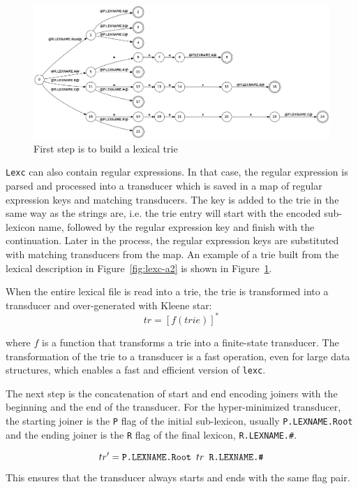 \documentclass[11pt]{article}
\begin{document}
\begin{figure}[h]
    \includegraphics[width=\textwidth]{trie.png}
     \caption{First step is to build a lexical trie
     \label{fig:trie}}
\end{figure}

\texttt{Lexc} can also contain regular expressions. In that case, the regular expression is parsed and processed into a transducer which is saved in a map of regular expression keys and matching transducers. The key is added to the trie in the same way as the strings are, i.e. the trie entry will start with 
the encoded sub-lexicon name, followed by the regular expression key and finish with the continuation. Later in the process, the regular expression 
keys are substituted with matching transducers from the map. 
An example of a trie built from the lexical description in Figure~\ref{fig:lexc-a2} is shown in Figure~\ref{fig:trie}.

When the entire lexical file is read into a trie, the trie is transformed into a transducer and over-generated with Kleene star:
\begin{equation}\label{eq:trie_star}
tr = \left[f(trie)\right]^* 
\end{equation}

where $f$ is a function that transforms a trie into a finite-state transducer. The transformation of the trie to a transducer is a fast operation, 
even for large data structures, which enables a fast and efficient version of \texttt{lexc}.

The next step is the concatenation of start and end encoding joiners with the beginning and the end of the transducer. 
For the hyper-minimized transducer, the starting joiner is the \verb+P+ flag of the initial sub-lexicon, usually \texttt{P.LEXNAME.Root} and the ending joiner is the \verb+R+ flag of the final lexicon, \texttt{R.LEXNAME.\#}.

\begin{equation}\label{eq:joiners}
tr' = \verb+P.LEXNAME.Root + tr \verb+ R.LEXNAME.#+
\end{equation}
This ensures that the transducer always starts and ends with the same flag pair.
\end{document}
